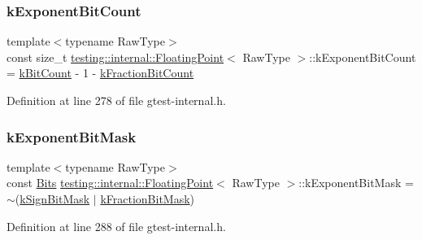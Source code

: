 \subsubsection{\texorpdfstring{k\+Exponent\+Bit\+Count}{kExponentBitCount}}
{\footnotesize\ttfamily template$<$typename Raw\+Type$>$ \\
const size\+\_\+t \hyperlink{classtesting_1_1internal_1_1FloatingPoint}{testing\+::internal\+::\+Floating\+Point}$<$ Raw\+Type $>$\+::k\+Exponent\+Bit\+Count = \hyperlink{classtesting_1_1internal_1_1FloatingPoint_ab819d2e8f93e9e482373999f0f8d71b9}{k\+Bit\+Count} -\/ 1 -\/ \hyperlink{classtesting_1_1internal_1_1FloatingPoint_a0b756a6d2a4f5f5b41ca79651c06c043}{k\+Fraction\+Bit\+Count}\hspace{0.3cm}{\ttfamily [static]}}



Definition at line 278 of file gtest-\/internal.\+h.

\mbox{\label{classtesting_1_1internal_1_1FloatingPoint_a66065dfc4d5f41100f686159637af23b}} 
\subsubsection{\texorpdfstring{k\+Exponent\+Bit\+Mask}{kExponentBitMask}}
{\footnotesize\ttfamily template$<$typename Raw\+Type$>$ \\
const \hyperlink{classtesting_1_1internal_1_1FloatingPoint_abf228bf6cd48f12c8b44c85b4971a731}{Bits} \hyperlink{classtesting_1_1internal_1_1FloatingPoint}{testing\+::internal\+::\+Floating\+Point}$<$ Raw\+Type $>$\+::k\+Exponent\+Bit\+Mask = $\sim$(\hyperlink{classtesting_1_1internal_1_1FloatingPoint_aca98b5ea6f2222a66a82e52421682efa}{k\+Sign\+Bit\+Mask} $\vert$ \hyperlink{classtesting_1_1internal_1_1FloatingPoint_a0ac75d4ffd24f14bca452abe8a718da1}{k\+Fraction\+Bit\+Mask})\hspace{0.3cm}{\ttfamily [static]}}



Definition at line 288 of file gtest-\/internal.\+h.

\mbox{\label{classtesting_1_1internal_1_1FloatingPoint_a0b756a6d2a4f5f5b41ca79651c06c043}} 
